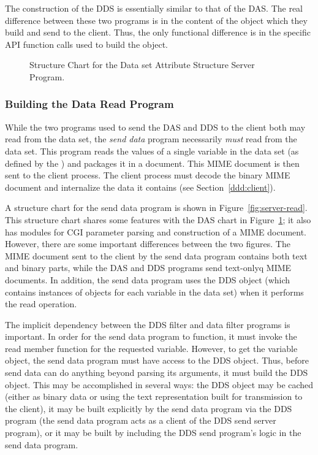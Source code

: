 The construction of the DDS is essentially similar to that of the DAS\@. The
real difference between these two programs is in the content of the object
which they build and send to the client. Thus, the only functional difference
is in the specific API function calls used to build the object.

\begin{figure}
\centerline{}
\caption{Structure Chart for the Data set Attribute Structure Server Program.}
\label{fig:server-das}
\end{figure}

\subsubsection{Building the Data Read Program}

While the two programs used to send the DAS and DDS to the client both may
read from the data set, the {\em send data\/} program necessarily {\em
  must\/} read from the data set. This program reads the values of a single
variable in the data set (as defined by the \Dap) and packages it in a \MIME
document. This MIME document is then sent to the client process. The client
process must decode the binary MIME document and internalize the data it
contains (see Section~\ref{ddd:client}).

A structure chart for the send data program is shown in
Figure~\ref{fig:server-read}. This structure chart shares some features with
the DAS chart in Figure~\ref{fig:server-das}; it also has modules for CGI
parameter parsing and construction of a MIME document. However, there are
some important differences between the two figures. The MIME document sent to
the client by the send data program contains both text and binary parts,
while the DAS and DDS programs send text-onlyq MIME documents. In addition,
the send data program uses the DDS object (which contains instances of
objects for each variable in the data set) when it performs the read
operation.

The implicit dependency between the DDS filter and data filter programs is
important. In order for the send data program to function, it must invoke the
read member function for the requested variable. However, to get the variable
object, the send data program must have access to the DDS object.  Thus,
before send data can do anything beyond parsing its arguments, it must build
the DDS object. This may be accomplished in several ways: the DDS object may
be cached (either as binary data or using the text representation built for
transmission to the client), it may be built explicitly by the send data
program via the DDS program (the send data program acts as a client of the
DDS send server program), or it may be built by including the DDS send
program's logic in the send data program.

